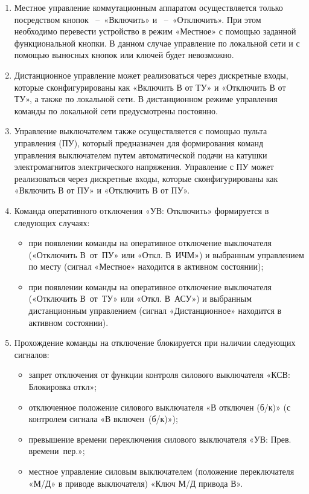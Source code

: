 \begin{enumerate}
\begin{enumerate}
\item
Местное управление коммутационным аппаратом осуществляется только посредством кнопок ~–~«Включить» и ~–~«Отключить». При этом необходимо перевести устройство в режим «Местное» с помощью заданной функциональной кнопки. В данном случае управление по локальной сети и с помощью выносных кнопок или ключей будет невозможно.
\item
Дистанционное управление может реализоваться через дискретные входы, которые сконфигурированы как «Включить В от ТУ» и «Отключить В от ТУ», а также по локальной сети. В дистанционном режиме управления команды по локальной сети предусмотрены постоянно.
\item
Управление выключателем также осуществляется с помощью пульта управления (ПУ), который предназначен для формирования команд управления выключателем путем автоматической подачи на катушки электромагнитов электрического напряжения. Управление с ПУ может реализоваться через дискретные входы, которые сконфигурированы как «Включить В от ПУ» и «Отключить В от ПУ».

\item
Команда оперативного отключения «УВ: Отключить» формируется в следующих случаях:
\begin{itemize}
	\item при появлении команды на оперативное отключение выключателя («Отключить В~от~ПУ» или «Откл. В~ИЧМ») и выбранным управлением по месту (сигнал «Местное» находится в активном состоянии);
	\item при появлении команды на оперативное отключение выключателя («Отключить В~от~ТУ» или «Откл. В~АСУ») и выбранным дистанционным управлением (сигнал «Дистанционное» находится в активном состоянии).
\end{itemize}
\item
Прохождение команды на отключение блокируется при наличии следующих сигналов:
\begin{itemize}
	\item запрет отключения от функции контроля силового выключателя «КСВ: Блокировка откл»;
	\item отключенное положение силового выключателя «В отключен (б/к)» (с контролем сигнала «В включен~(б/к)»);
	\item превышение времени переключения силового выключателя «УВ: Прев. времени~пер.»;
	\item местное управление силовым выключателем (положение переключателя «М/Д» в приводе выключателя) «Ключ М/Д привода В».
\end{itemize}


\end{enumerate}
\end{enumerate}
